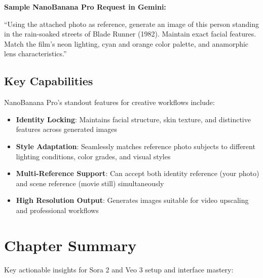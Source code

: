 \begin{Prompt}
\textbf{Sample NanoBanana Pro Request in Gemini:}

``Using the attached photo as reference, generate an image of this person standing in the rain-soaked streets of Blade Runner (1982). Maintain exact facial features. Match the film's neon lighting, cyan and orange color palette, and anamorphic lens characteristics.''
\end{Prompt}

\subsection{Key Capabilities}

NanoBanana Pro's standout features for creative workflows include:

\begin{itemize}
\item \textbf{Identity Locking}: Maintains facial structure, skin texture, and distinctive features across generated images
\item \textbf{Style Adaptation}: Seamlessly matches reference photo subjects to different lighting conditions, color grades, and visual styles
\item \textbf{Multi-Reference Support}: Can accept both identity reference (your photo) and scene reference (movie still) simultaneously
\item \textbf{High Resolution Output}: Generates images suitable for video upscaling and professional workflows
\end{itemize}

\begin{center}
\end{center}

\section*{Chapter Summary}

Key actionable insights for Sora 2 and Veo 3 setup and interface mastery:

